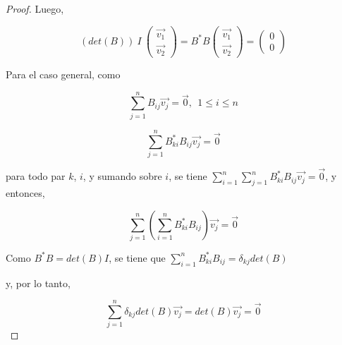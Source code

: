 \begin{corollary}
\begin{proof}
Luego,  



$$(det(B))~I~\left(\begin{array}{c} \vec{v_1} \\ \vec{v_2}  
 \end{array}\right)=B^{*}B \left(\begin{array}{c}\vec{v_1} \\ \vec{v_2}  
 \end{array}\right)  = \left(\begin{array}{c} 0 \\ 0  
 \end{array}\right)$$


\bigskip



Para el caso general, como

\bigskip

$$\sum^{n}_{j=1}B_{ij}\vec{v_j}=\vec{0},~~1\leq i \leq n $$

\bigskip

$$\sum^{n}_{j=1}B^{*}_{ki}B_{ij}\vec{v_j}=\vec{0}$$ 

\noindent
para todo par $k$, $i$, y sumando sobre $i$, se tiene $\sum^{n}_{i=1}\sum^{n}_{j=1}B^{*}_{ki}B_{ij}\vec{v_j}=\vec{0} $, y entonces,  

\bigskip

$$\sum^{n}_{j=1}(\sum^{n}_{i=1}B^{*}_{ki}B_{ij})\vec{v_j}=\vec{0} $$ 

\bigskip




Como $B^{*}B=det(B)I$, se tiene que  $\sum^{n}_{i=1}B^{*}_{ki}B_{ij}=\delta_{kj}det(B)$

\bigskip

\noindent
y, por lo tanto,

$$\sum^{n}_{j=1}\delta_{kj}det(B)\vec{v_j}=det(B)\vec{v_j}=\vec{0} $$
 
\bigskip






\end{proof}
\end{corollary}

\bigskip

\bigskip


